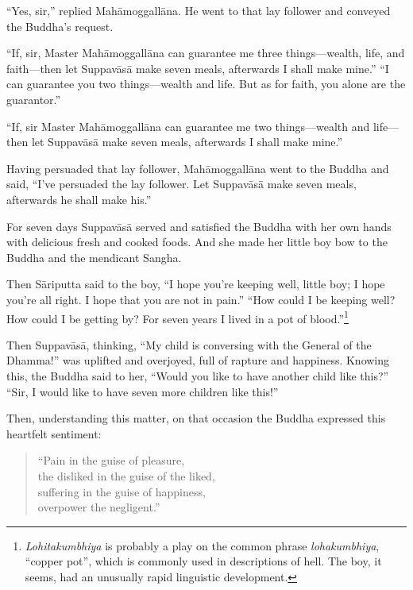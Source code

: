 \documentclass[12pt,openany]{book}%
\begin{document}
“Yes, sir,” replied \textsanskrit{Mahāmoggallāna}. He went to that lay follower and conveyed the Buddha’s request. 

“If, sir, Master \textsanskrit{Mahāmoggallāna} can guarantee me three things—wealth, life, and faith—then let \textsanskrit{Suppavāsā} make seven meals, afterwards I shall make mine.” “I can guarantee you two things—wealth and life. But as for faith, you alone are the guarantor.” 

“If, sir Master \textsanskrit{Mahāmoggallāna} can guarantee me two things—wealth and life—then let \textsanskrit{Suppavāsā} make seven meals, afterwards I shall make mine.” 

Having persuaded that lay follower, \textsanskrit{Mahāmoggallāna} went to the Buddha and said, “I’ve persuaded the lay follower. Let \textsanskrit{Suppavāsā} make seven meals, afterwards he shall make his.” 

For seven days \textsanskrit{Suppavāsā} served and satisfied the Buddha with her own hands with delicious fresh and cooked foods. And she made her little boy bow to the Buddha and the mendicant Sangha. 

Then \textsanskrit{Sāriputta} said to the boy, “I hope you’re keeping well, little boy; I hope you’re all right. I hope that you are not in pain.” “How could I be keeping well? How could I be getting by? For seven years I lived in a pot of blood.”\footnote{\textit{Lohitakumbhiya} is probably a play on the common phrase \textit{lohakumbhiya}, “copper pot”, which is commonly used in descriptions of hell. The boy, it seems, had an unusually rapid linguistic development. } 

Then \textsanskrit{Suppavāsā}, thinking, “My child is conversing with the General of the Dhamma!” was uplifted and overjoyed, full of rapture and happiness. Knowing this, the Buddha said to her, “Would you like to have another child like this?” “Sir, I would like to have seven more children like this!” 

Then, understanding this matter, on that occasion the Buddha expressed this heartfelt sentiment: 

\begin{verse}%
“Pain in the guise of pleasure, \\
the disliked in the guise of the liked, \\
suffering in the guise of happiness, \\
overpower the negligent.” 

%
\end{verse}
\end{document}

